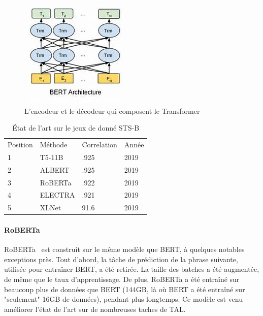 \documentclass[11pt,a4paper, french]{article}
\begin{document}
\begin{figure}
	\includegraphics[width=\linewidth]{bert.jpg}
	\caption{L'encodeur et le décodeur qui composent le Transformer}
	
\end{figure} 
	
	\begin{table}[]
		\begin{tabular}{llll}
			\hline
			Position & Méthode & Correlation & Année \\
			1        & T5-11B  & .925                 & 2019  \\
			2        & ALBERT  & .925                 & 2019  \\
			3        & RoBERTa & .922                 & 2019  \\
			4        & ELECTRA & .921                 & 2019  \\
			5        & XLNet   & 91.6                 & 2019 
		\end{tabular}
	  \caption{État de l'art sur le jeux de donné STS-B}
	\end{table}


\paragraph{RoBERTa}

RoBERTa~\cite{RoBERTa} est construit sur le même modèle que BERT, à quelques notables exceptions près. Tout d'abord, la tâche de prédiction de la phrase suivante, utilisée pour entraîner BERT, a été retirée. La taille des batches a été augmentée, de même que le taux d'apprentissage. De plus, RoBERTa a été entraîné sur beaucoup plus de données que BERT (144GB, là où BERT a été entraîné sur "seulement" 16GB de données), pendant plus longtemps. Ce modèle est venu améliorer l'état de l'art sur de nombreuses taches de TAL.
\end{document}

